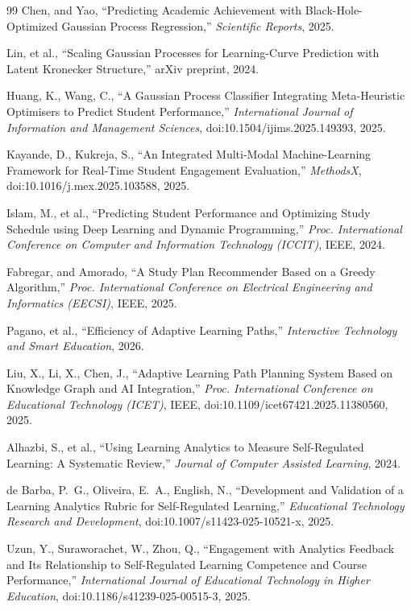 \documentclass[12pt]{report}
\begin{document}
\begin{thebibliography}{99}
 Chen, and Yao, ``Predicting Academic Achievement with Black-Hole-Optimized Gaussian Process Regression,'' \textit{Scientific Reports}, 2025.

 Lin, et al., ``Scaling Gaussian Processes for Learning-Curve Prediction with Latent Kronecker Structure,'' arXiv preprint, 2024.

 Huang, K., Wang, C., ``A Gaussian Process Classifier Integrating Meta-Heuristic Optimisers to Predict Student Performance,'' \textit{International Journal of Information and Management Sciences}, doi:10.1504/ijims.2025.149393, 2025.

 Kayande, D., Kukreja, S., ``An Integrated Multi-Modal Machine-Learning Framework for Real-Time Student Engagement Evaluation,'' \textit{MethodsX}, doi:10.1016/j.mex.2025.103588, 2025.

 Islam, M., et al., ``Predicting Student Performance and Optimizing Study Schedule using Deep Learning and Dynamic Programming,'' \textit{Proc. International Conference on Computer and Information Technology (ICCIT)}, IEEE, 2024.

 Fabregar, and Amorado, ``A Study Plan Recommender Based on a Greedy Algorithm,'' \textit{Proc. International Conference on Electrical Engineering and Informatics (EECSI)}, IEEE, 2025.

 Pagano, et al., ``Efficiency of Adaptive Learning Paths,'' \textit{Interactive Technology and Smart Education}, 2026.

 Liu, X., Li, X., Chen, J., ``Adaptive Learning Path Planning System Based on Knowledge Graph and AI Integration,'' \textit{Proc. International Conference on Educational Technology (ICET)}, IEEE, doi:10.1109/icet67421.2025.11380560, 2025.

 Alhazbi, S., et al., ``Using Learning Analytics to Measure Self-Regulated Learning: A Systematic Review,'' \textit{Journal of Computer Assisted Learning}, 2024.

 de Barba, P.~G., Oliveira, E.~A., English, N., ``Development and Validation of a Learning Analytics Rubric for Self-Regulated Learning,'' \textit{Educational Technology Research and Development}, doi:10.1007/s11423-025-10521-x, 2025.

 Uzun, Y., Suraworachet, W., Zhou, Q., ``Engagement with Analytics Feedback and Its Relationship to Self-Regulated Learning Competence and Course Performance,'' \textit{International Journal of Educational Technology in Higher Education}, doi:10.1186/s41239-025-00515-3, 2025.


\end{thebibliography}
\end{document}
